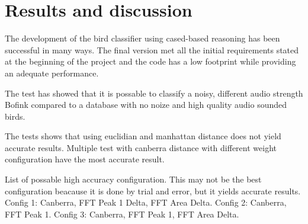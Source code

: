 \section{Results and discussion}
The development of the bird classifier using cased-based reasoning has
been successful in many ways. The final version met all the initial requirements
stated at the beginning of the project and the code has a low footprint while
providing an adequate performance.

The test has showed that it is possable to classify a noisy, different audio strength Bofink compared to a database with no noize and high quality audio sounded birds.

The tests shows that using euclidian and manhattan distance does not yield accurate results.
Multiple test with canberra distance with different weight configuration have the most accurate result.

List of possable high accuracy configuration.
This may not be the best configuration beacause it is done by trial and error, but it yields accurate results.
Config 1: Canberra, FFT Peak 1 Delta, FFT Area Delta.
Config 2: Canberra, FFT Peak 1.
Config 3: Canberra, FFT Peak 1, FFT Area Delta.
